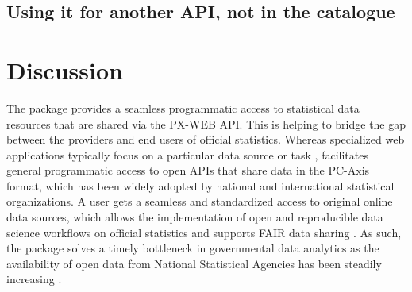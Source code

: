 \subsection{Using it for another API, not in the catalogue}


\section[summary]{Discussion}




The  package provides a seamless programmatic access to
statistical data resources that are shared via the PX-WEB API. This is
helping to bridge the gap between the providers and end users of
official statistics. Whereas specialized web applications typically
focus on a particular data source or task \cite{xxx}, 
facilitates general programmatic access to open APIs that share data
in the PC-Axis format, which has been widely adopted by national and
international statistical organizations. A user gets a seamless and
standardized access to original online data sources, which allows the
implementation of open and reproducible data science workflows on
official statistics \citep{Gandrud13, Boettiger2015} and supports FAIR
data sharing \cite{xxx}. As such, the package solves a timely
bottleneck in governmental data analytics as the availability of open
data from National Statistical Agencies has been steadily increasing
\cite{xxx}.


